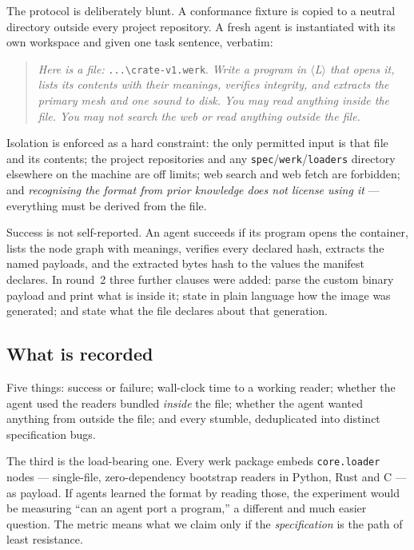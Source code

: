 \documentclass[10pt,twocolumn,letterpaper]{article}
\newcommand{\code}[1]{\texttt{\small #1}}
\begin{document}
The protocol is deliberately blunt. A conformance fixture is copied to a neutral
directory outside every project repository. A fresh agent is instantiated with
its own workspace and given one task sentence, verbatim:

\begin{quote}\small
\emph{Here is a file:} \code{...\textbackslash{}crate-v1.werk}. \emph{Write a
program in $\langle$L$\rangle$ that opens it, lists its contents with their
meanings, verifies integrity, and extracts the primary mesh and one sound to
disk. You may read anything inside the file. You may not search the web or read
anything outside the file.}
\end{quote}

Isolation is enforced as a hard constraint: the only permitted input is that file
and its contents; the project repositories and any \code{spec}/\code{werk}/\code{loaders}
directory elsewhere on the machine are off limits; web search and web fetch are
forbidden; and \emph{recognising the format from prior knowledge does not license
using it} --- everything must be derived from the file.

Success is not self-reported. An agent succeeds if its program opens the
container, lists the node graph with meanings, verifies every declared hash,
extracts the named payloads, and the extracted bytes hash to the values the
manifest declares. In round~2 three further clauses were added: parse the custom
binary payload and print what is inside it; state in plain language how the image
was generated; and state what the file declares about that generation.

\subsection{What is recorded}

Five things: success or failure; wall-clock time to a working reader; whether the
agent used the readers bundled \emph{inside} the file; whether the agent wanted
anything from outside the file; and every stumble, deduplicated into distinct
specification bugs.

The third is the load-bearing one. Every werk package embeds \code{core.loader}
nodes --- single-file, zero-dependency bootstrap readers in Python, Rust and C ---
as payload. If agents learned the format by reading those, the experiment would be
measuring ``can an agent port a program,'' a different and much easier question.
The metric means what we claim only if the \emph{specification} is the path of
least resistance.
\end{document}
